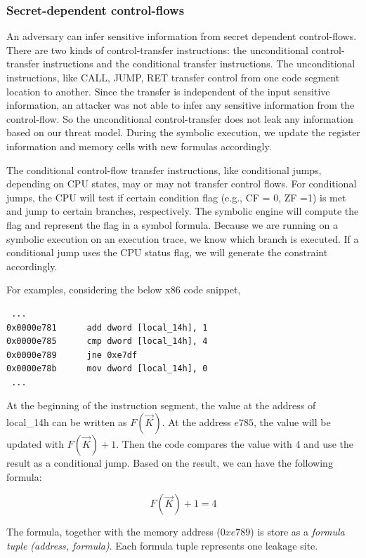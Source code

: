 \subsubsection{Secret-dependent control-flows}
An adversary can infer sensitive information from secret dependent control-flows. There are two kinds of control-transfer instructions: the unconditional control-transfer instructions and the conditional transfer instructions.
The unconditional instructions, like CALL, JUMP, RET transfer control from one code segment location to another. Since the transfer is independent of the input sensitive information, an attacker was not able to infer any sensitive information from the control-flow.
So the unconditional control-transfer does not leak any information based on our threat model. During the symbolic execution, we update the register information and memory cells with new formulas accordingly.

The conditional control-flow transfer instructions, like conditional jumps, depending on CPU states, may or may not transfer control flows. For conditional jumps, the CPU will test if certain condition flag
(e.g., CF = 0, ZF =1) is met and jump to certain branches, respectively.
The symbolic engine will compute the flag and represent the flag in a symbol
formula. Because we are running on a symbolic execution on an execution trace, we know which branch is executed.
If a conditional jump uses the CPU status flag, we will generate the constraint accordingly.

For examples, considering the below x86 code snippet,

\begin{lstlisting}
 ...
0x0000e781      add dword [local_14h], 1
0x0000e785      cmp dword [local_14h], 4
0x0000e789      jne 0xe7df
0x0000e78b      mov dword [local_14h], 0
 ...
\end{lstlisting}

At the beginning of the instruction segment, the value at the address of local\_14h can be written as $F(\vec{K})$. At the address $e785$, the value will be updated with $F(\vec{K})+1$. Then the code compares
the value with 4 and use the result as a conditional jump. Based on the result, we can have the following formula:

$$F(\vec{K}) + 1 = 4$$

The formula, together with the memory address ($0xe789$) is store as a \textit{formula tuple (address, formula)}. Each formula tuple represents one leakage site.

